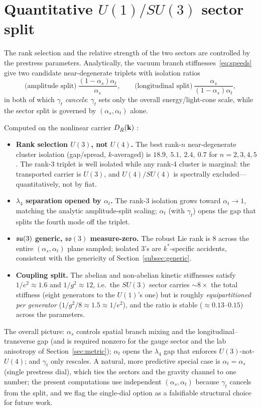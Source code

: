 \section{Quantitative $U(1)/SU(3)$ sector split}
\label{sec:split}

The rank selection and the relative strength of the two sectors are controlled by the prestress
parameters. Analytically, the vacuum branch stiffnesses~\eqref{eq:speeds} give two candidate
near-degenerate triplets with isolation ratios
\begin{equation}
  \text{(amplitude split)}\ \frac{(1-\alpha_s)\alpha_t}{\alpha_s},
  \qquad
  \text{(longitudinal split)}\ \frac{\alpha_s}{(1-\alpha_s)\alpha_t},
\end{equation}
in both of which $\gamma_t$ \emph{cancels}: $\gamma_t$ sets only the overall energy/light-cone
scale, while the sector split is governed by $(\alpha_s,\alpha_t)$ alone.

Computed on the nonlinear carrier $D_{\bar R}(\mathbf{k})$ \citep{repo}:
\begin{itemize}
  \item \textbf{Rank selection $U(3)$, not $U(4)$.} The best rank-$n$ near-degenerate cluster
  isolation (gap/spread, $k$-averaged) is $18.9,\ 5.1,\ 2.4,\ 0.7$ for $n=2,3,4,5$. The rank-3
  triplet is well isolated while any rank-4 cluster is marginal: the transported carrier is
  $U(3)$, and $U(4)/SU(4)$ is spectrally excluded---quantitatively, not by fiat.
  \item \textbf{$\lambda_4$ separation opened by $\alpha_t$.} The rank-3 isolation grows toward
  $\alpha_t\to 1$, matching the analytic amplitude-split scaling; $\alpha_t$ (with $\gamma_t$)
  opens the gap that splits the fourth mode off the triplet.
  \item \textbf{$\mathfrak{su}(3)$ generic, $\mathfrak{so}(3)$ measure-zero.} The robust Lie rank is $8$
  across the entire $(\alpha_s,\alpha_t)$ plane sampled; isolated $3$'s are $k^\ast$-specific
  accidents, consistent with the genericity of Section~\ref{subsec:generic}.
  \item \textbf{Coupling split.} The abelian and non-abelian kinetic stiffnesses satisfy
  $1/e^2\approx 1.6$ and $1/g^2\approx 12$, i.e.\ the $SU(3)$ sector carries $\sim 8\times$ the
  total stiffness (eight generators to the $U(1)$'s one) but is roughly \emph{equipartitioned
  per generator} ($1/g^2/8\approx 1.5\approx 1/e^2$), and the ratio is stable ($\approx
  0.13$--$0.15$) across the parameters.
\end{itemize}

The overall picture: $\alpha_s$ controls spatial branch mixing and the longitudinal--transverse
gap (and is required nonzero for the gauge sector and the lab anisotropy of
Section~\ref{sec:metric}); $\alpha_t$ opens the $\lambda_4$ gap that enforces $U(3)$-not-$U(4)$;
and $\gamma_t$ only rescales. A natural, more predictive special case is $\alpha_t=\alpha_s$
(single prestress dial), which ties the sectors and the gravity channel to one number; the
present computations use independent $(\alpha_s,\alpha_t)$ because $\gamma_t$ cancels from the
split, and we flag the single-dial option as a falsifiable structural choice for future work.
